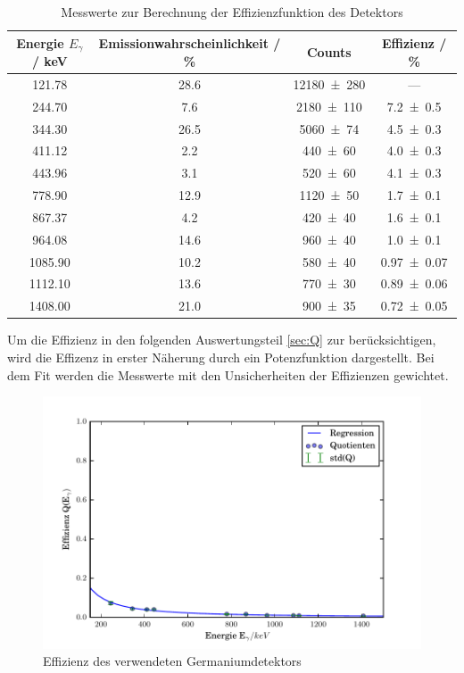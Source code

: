 \begin{table}
  \centering
  \begin{tabular}{c| c c c}
     \toprule
    	Energie $E_{\gamma}$ / keV& Emissionwahrscheinlichkeit / \% & Counts & Effizienz / \% \\
     \midrule
     121.78  &28.6 &\num{12180 +- 280} 	& ---	\\
     244.70  &7.6  &\num{2180 +- 110} 	& \num{7.2 +- 0.5}	\\
     344.30  &26.5 &\num{5060 +- 74} 	& \num{4.5 +- 0.3} 	\\
     411.12  &2.2  &\num{440 +- 60} 	& \num{4.0 +- 0.3} 	\\
     443.96  &3.1  &\num{520 +- 60} 	& \num{4.1 +- 0.3} 	\\
     778.90  &12.9 &\num{1120 +- 50}	& \num{1.7 +- 0.1}	\\
     867.37  &4.2  &\num{420 +- 40} 	& \num{1.6 +- 0.1}	\\
     964.08  &14.6 &\num{960 +- 40} 	& \num{1.0 +- 0.1}	\\
     1085.90 &10.2 &\num{580 +- 40} 	& \num{0.97 +- 0.07}	\\
     1112.10 &13.6 &\num{770 +- 30} 	& \num{0.89 +- 0.06}	\\
     1408.00 &21.0 &\num{900 +- 35} 	& \num{0.72 +- 0.05}	\\
     \bottomrule
  \end{tabular}
  \caption{Messwerte zur Berechnung der Effizienzfunktion des Detektors}
  \label{tab:<+label+>}
\end{table}

Um die Effizienz in den folgenden Auswertungsteil \ref{sec:Q} zur berücksichtigen, wird die Effizenz in erster Näherung durch ein Potenzfunktion dargestellt. Bei dem Fit werden die Messwerte mit den Unsicherheiten der Effizienzen gewichtet. 

\begin{figure}[H]
  \centering
  \includegraphics[width=\textwidth]{./build/Effizienz.pdf}
  \caption{Effizienz des verwendeten Germaniumdetektors}
  \label{fig:Efi}
\end{figure}

